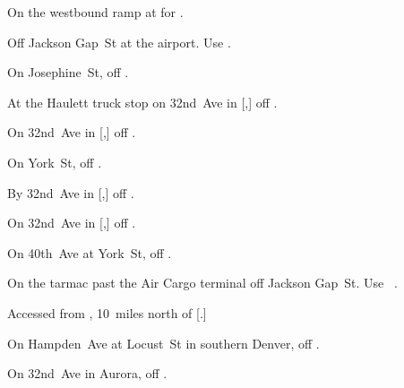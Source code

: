 
\begin{LocationList}

On the westbound ramp at   for .

Off Jackson Gap~St at the airport.
Use  .

\Location{\GarageHQ \Garage}
On Josephine~St, off  .

At the Haulett truck stop on 32nd~Ave in [,] off  .

On 32nd~Ave in [,] off  .

On York~St, off  .

\Location{\RecruitmentAgency \Recruitment}
By 32nd~Ave in [,] off  .

On 32nd~Ave in [,] off  .

On 40th~Ave at York~St, off  .

On the tarmac past the Air Cargo terminal off Jackson Gap~St.
Use~ .

Accessed from , 10~miles north of [.]

On  Hampden~Ave at Locust~St in southern Denver, off  .

On 32nd~Ave in Aurora, off  .

\end{LocationList}
